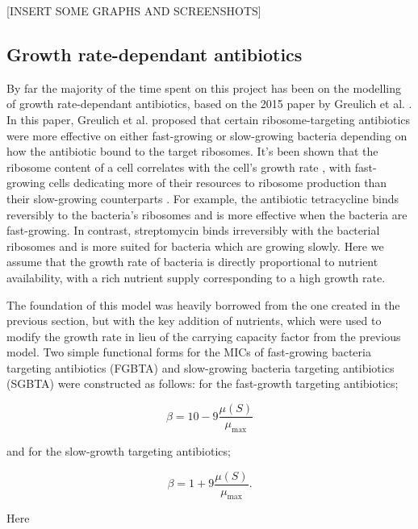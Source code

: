 \documentclass[a4paper,12pt]{article}
\begin{document}
[INSERT SOME GRAPHS AND SCREENSHOTS]


\subsection{Growth rate-dependant antibiotics}

By far the majority of the time spent on this project has been on the modelling of growth rate-dependant antibiotics, based on the 2015 paper by Greulich et al. 
\cite{bioref:Greulich-growthDependentAntibiotics}.  In this paper, Greulich et al. proposed that certain ribosome-targeting antibiotics were more effective on either 
fast-growing or slow-growing bacteria depending on how the antibiotic bound to the target ribosomes.  It's been shown that the ribosome content of a cell correlates with 
the cell's growth rate \cite{bioref:Bremer-ribosome-content-2008}, with fast-growing cells dedicating more of their resources to ribosome production than their slow-growing 
counterparts \cite{bioref:Scott-ribosome-content-2010}.  For example, the antibiotic tetracycline binds reversibly to the bacteria's ribosomes and is more effective when the 
bacteria are fast-growing.  In contrast, streptomycin binds irreversibly with the bacterial ribosomes and is more suited for bacteria which are growing slowly.  Here we 
assume that the growth rate of bacteria is directly proportional to nutrient availability, with a rich nutrient supply corresponding to a high growth rate.


The foundation of this model was heavily borrowed from the one created in the previous section, but with the key addition of nutrients, which were used to modify the 
growth rate in lieu of the carrying capacity factor from the previous model.  Two simple functional forms for the MICs of fast-growing bacteria targeting antibiotics (FGBTA)
and slow-growing bacteria targeting antibiotics (SGBTA) were constructed as follows: for the fast-growth targeting antibiotics; 

\begin{equation}
 \beta =  10 - 9\frac{\mu(S)}{\mu_{\max}}
 \label{eqn:fast-growth-beta}
\end{equation}

and for the slow-growth targeting antibiotics;

\begin{equation}
 \beta = 1 + 9\frac{\mu(S)}{\mu_{\max}}.
 \label{eqn:slow-growth-beta}
\end{equation}


Here 
\end{document}
